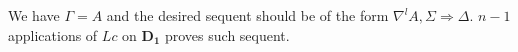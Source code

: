 We have $\Gamma = A$ and the desired sequent should be of the form $\nabla^l A , \Sigma \Rightarrow \Delta$. $n-1$ applications of $Lc$ on $\mathbf{D_1}$ proves such sequent.
